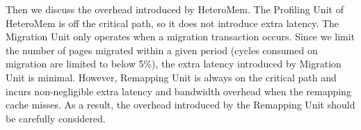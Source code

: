 


Then we discuss the overhead introduced by HeteroMem. The Profiling Unit of HeteroMem is off the critical path, so it does not introduce extra latency. The Migration Unit only operates when a migration transaction occurs. Since we limit the number of pages migrated within a given period (cycles consumed on migration are limited to below 5\%), the extra latency introduced by Migration Unit is minimal. However, Remapping Unit is always on the critical path and incurs non-negligible extra latency and bandwidth overhead when the remapping cache misses. As a result, the overhead introduced by the Remapping Unit should be carefully considered.

